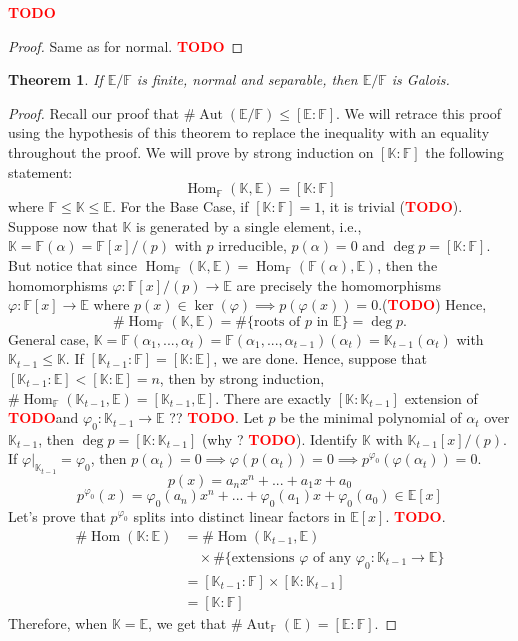\documentclass{article}
\newtheorem*{theorem}{Theorem}
\newcommand{\F}{\mathbb{F}}
\newcommand{\E}{\mathbb{E}}
\newcommand{\K}{\mathbb{K}}
\DeclareMathOperator{\Aut}{\text{Aut}}
\DeclareMathOperator{\Hom}{\text{Hom}}
\newcommand{\td}{\textcolor{red}{\textbf{TODO}}}
\begin{document}
\td 

\begin{proof}
    Same as for normal. \td 
\end{proof}

\begin{theorem}
    If $\E / \F$ is finite, normal and separable, then $\E / \F$ is Galois.
\end{theorem}

\begin{proof}
    Recall our proof that $\# \Aut(\E / \F) \leq [\E : \F]$. We will retrace this proof using the hypothesis of this theorem to replace the inequality with an equality throughout the proof. We will prove by strong induction on $[\K : \F]$ the following statement:
    $$\Hom_{\F}(\K, \E) = [\K : \F]$$
    where $\F \leq \K \leq \E$. For the Base Case, if $[\K : \F] = 1$, it is trivial (\td). Suppose now that $\K$ is generated by a single element, i.e., $\K = \F(\alpha) = \F[x]/(p)$ with $p$ irreducible, $p(\alpha) = 0$ and $\deg p = [\K : \F]$. But notice that since $\Hom_{\F}(\K, \E) = \Hom_{\F}(\F(\alpha), \E)$, then the homomorphisms $\varphi : \F[x]/(p) \to \E$ are precisely the homomorphisms $\varphi : \F[x] \to \E$ where $p(x) \in \ker(\varphi) \implies p(\varphi(x)) = 0$.(\td) Hence,
    $$\# \Hom_{\F}(\K, \E) = \# \{\text{roots of } p \text{ in } \E\} = \deg p.$$
    General case, $\K = \F(\alpha_1, ..., \alpha_t) = \F(\alpha_1, ..., \alpha_{t-1})(\alpha_t) = \K_{t-1}(\alpha_t)$ with $\K_{t-1} \leq \K$. If $[\K_{t-1} : \F] = [\K : \E]$, we are done. Hence, suppose that $[\K_{t-1} : \E] < [\K : \E] = n$, then by strong induction, $\# \Hom_{\F}(\K_{t-1}, \E) = [\K_{t-1}, \E]$. There are exactly $[\K : \K_{t-1}]$ extension of \td and $\varphi_0 : \K_{t-1} \to \E$ ?? \td. Let $p$ be the minimal polynomial of $\alpha_t$ over $\K_{t-1}$, then $\deg p = [\K : \K_{t-1}]$ (why ? \td). Identify $\K$ with $\K_{t-1}[x] / (p)$. If $\varphi|_{\K_{t-1}} = \varphi_0$, then $p(\alpha_t) = 0 \implies \varphi(p(\alpha_t)) = 0 \implies p^{\varphi_0}(\varphi(\alpha_t)) = 0$.
    $$p(x) = a_n x^n + ... + a_1x + a_0$$
    $$p^{\varphi_0}(x) = \varphi_0(a_n)x^n + ... + \varphi_0(a_1)x + \varphi_0(a_0) \in \E[x]$$
    Let's prove that $p^{\varphi_0}$ splits into distinct linear factors in $\E[x]$. \td. 
    \begin{align*}
        \# \Hom(\K : \E) &= \# \Hom(\K_{t-1}, \E) \\
        & \quad \times \# \{\text{extensions } \varphi \text{ of any }\varphi_0 :  \K_{t-1} \to \E\} \\
        &= [\K_{t-1} : \F] \times [\K : \K_{t-1}] \\
        &= [\K : \F] 
    \end{align*}
    Therefore, when $\K = \E$, we get that $\# \Aut_{\F}(\E) = [\E : \F]$.
\end{proof}
\end{document}
